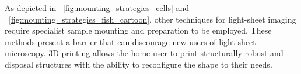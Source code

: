 As depicted in \figurename~\ref{fig:mounting_strategies_cells} and \figurename~\ref{fig:mounting_strategies_fish_cartoon}, other techniques for light-sheet imaging require specialist sample mounting and preparation to be employed.
These methods present a barrier that can discourage new users of light-sheet microscopy.
\gls{3D printing} allows the home user to print structurally robust and disposal structures with the ability to reconfigure the shape to their needs.
